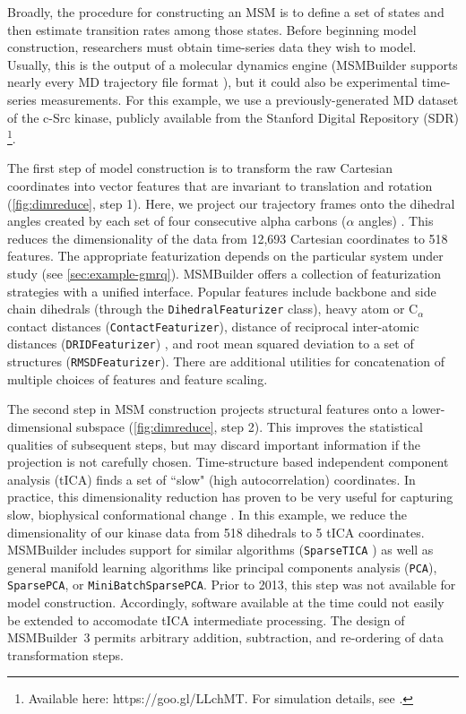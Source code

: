 Broadly, the procedure for constructing an MSM is to define a set of states
and then estimate transition rates among those states.  Before beginning
model construction, researchers must obtain time-series data they wish to
model.  Usually, this is the output of a molecular dynamics engine
(MSMBuilder supports nearly every MD trajectory file format \cite{2015-mdtraj}), 
but it
could also be experimental time-series measurements. For this example, we
use a previously-generated MD dataset of the c-Src kinase, publicly
available from the Stanford Digital Repository (SDR) \footnote{Available here:
https://goo.gl/LLchMT.  For simulation details, see
\citet{Shukla_NatCommun14}.}. 

The first step of model construction is to transform the raw Cartesian
coordinates into vector features that are invariant to
translation and rotation (\cref{fig:dimreduce}, step
1).  Here, we project our trajectory frames onto the dihedral angles
created by each set of four consecutive alpha carbons ($\alpha$ angles)
\cite{Flocco_ProteinSci95}.  This reduces the dimensionality of the data
from 12,693 Cartesian coordinates to 518 features.  The appropriate
featurization depends on the particular system under study (see \cref{sec:example-gmrq}). MSMBuilder
offers a collection of featurization strategies with a unified interface.
Popular features include backbone and side chain dihedrals (through the
\texttt{DihedralFeaturizer} class), heavy atom or  C$_\alpha$ contact
distances (\texttt{ContactFeaturizer}), distance of reciprocal inter-atomic
distances (\texttt{DRIDFeaturizer}) \cite{2012-drid}, and root mean squared
deviation to a set of structures (\texttt{RMSDFeaturizer}). There are
additional utilities for concatenation of multiple choices of features and
feature scaling.

The second step in MSM construction projects structural features onto
a lower-dimensional subspace
(\cref{fig:dimreduce}, step 2). This improves the statistical qualities
of subsequent steps, but may discard important information if the
projection is not carefully chosen.
Time-structure based independent
component analysis (tICA) finds a set of ``slow" (high autocorrelation)
coordinates. In practice, this dimensionality reduction
has proven to be very useful for capturing
slow, biophysical conformational change 
\cite{2013-schwantes-tica, 2013-noe-tica}.
In this example, we reduce the dimensionality
of our kinase data from 518 dihedrals to 5 tICA coordinates.
MSMBuilder includes support for similar algorithms
(\texttt{SparseTICA} \cite{2016-sparsetica}) as well as general manifold
learning algorithms like principal components analysis (\texttt{PCA}),
\texttt{SparsePCA}, or \texttt{MiniBatchSparsePCA}. Prior to 2013, this
step was not available for model construction. Accordingly, software
available at the time could not easily be extended to accomodate tICA
intermediate processing. The design of MSMBuilder~3 permits arbitrary
addition, subtraction, and re-ordering of data transformation steps.

